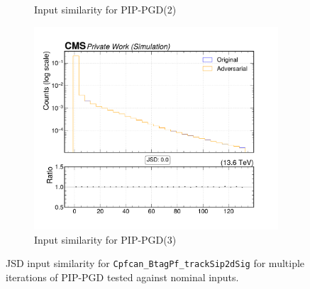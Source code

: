 \begin{figure}[htbp]
\begin{subfigure}[t]{0.32\textwidth}
    \caption*{Input similarity for PIP-PGD(2)}
  \end{subfigure}\hfill
  \begin{subfigure}[t]{0.32\textwidth}
    \includegraphics[width=\linewidth]{media/output/features/compare/combined_it_3/cmp_cpf_arr_Cpfcan_BtagPf_trackSip2dSig.pdf}
    \caption*{Input similarity for PIP-PGD(3)}
  \end{subfigure}

  \caption*{JSD input similarity for \texttt{Cpfcan\_BtagPf\_trackSip2dSig} for multiple iterations of PIP-PGD tested against nominal inputs.}
  \label{fig:combined_input_Cpfcan_BtagPf_trackSip2dSig}
\end{figure}

